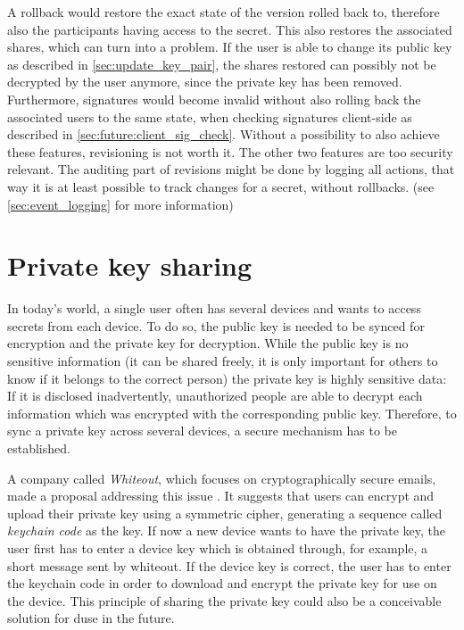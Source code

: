 A rollback would restore the exact state of the version rolled back to,
therefore also the participants having access to the secret. This also restores
the associated shares, which can turn into a problem. If the user is able to
change its public key as described in \ref{sec:update_key_pair}, the shares
restored can possibly not be decrypted by the user anymore, since the private
key has been removed. Furthermore, signatures would become invalid without also
rolling back the associated users to the same state, when checking signatures
client-side as described in \ref{sec:future:client_sig_check}. Without a
possibility to also achieve these features, revisioning is not worth it. The
other two features are too security relevant. The auditing part of revisions
might be done by logging all actions, that way it is at least possible to track
changes for a secret, without rollbacks. (see \ref{sec:event_logging} for more
information)

\section{Private key sharing}

In today's world, a single user often has several devices and wants to access
secrets from each device. To do so, the public key is needed to be synced for
encryption and the private key for decryption. While the public key is no
sensitive information (it can be shared freely, it is only important for others
to know if it belongs to the correct person) the private key is highly sensitive
data: If it is disclosed inadvertently, unauthorized people are able to decrypt
each information which was encrypted with the corresponding public key. Therefore,
to sync a private key across several devices, a secure mechanism has to be
established.

A company called \textit{Whiteout}, which focuses on cryptographically secure
emails, made a proposal addressing this issue \cite{whiteout_pgp_sync}. It
suggests that users can encrypt and upload their private key using a symmetric
cipher, generating a sequence called \textit{keychain code} as the key.
If now a new device wants to have the private key, the user first has to enter
a device key which is obtained through, for example, a short message sent by
whiteout. If the device key is correct, the user has to enter the keychain code
in order to download and encrypt the private key for use on the device.
This principle of sharing the private key could also be a conceivable solution
for duse in the future. \cite{whiteout_pgp_sync}

